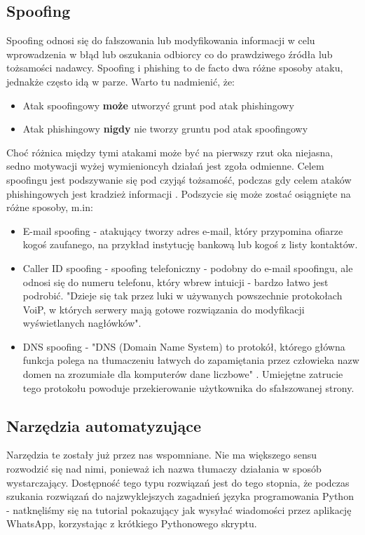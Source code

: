 \documentclass[]{article}
\begin{document}
\subsection{Spoofing}
Spoofing odnosi się do fałszowania lub modyfikowania informacji w celu wprowadzenia w błąd lub oszukania odbiorcy co do prawdziwego źródła lub tożsamości nadawcy. Spoofing i phishing to de facto dwa różne sposoby ataku, jednakże często idą w parze. Warto tu nadmienić, że:
\begin{itemize}[label=$\rightarrow$]
	\item Atak spoofingowy {\bfseries może} utworzyć grunt pod atak phishingowy
	\item Atak phishingowy {\bfseries nigdy} nie tworzy gruntu pod atak spoofingowy
\end{itemize}
Choć różnica między tymi atakami może być na pierwszy rzut oka niejasna, sedno motywacji wyżej wymienioncyh działań jest zgoła odmienne. Celem spoofingu jest podszywanie się pod czyjąś tożsamość, podczas gdy celem ataków phishingowych jest kradzież informacji \cite{crowdstrike_phishing_vs_spoofing}.
Podszycie się może zostać osiągnięte na różne sposoby, m.in:
\begin{itemize}[label=$\rightarrow$]
	\item E-mail spoofing - atakujący tworzy adres e-mail, który przypomina ofiarze kogoś zaufanego, na przykład instytucję bankową lub kogoś z listy kontaktów.
	\item Caller ID spoofing - spoofing telefoniczny - podobny do e-mail spoofingu, ale odnosi się do numeru telefonu, który wbrew intuicji - bardzo łatwo jest podrobić. "Dzieje się tak przez luki w używanych powszechnie protokołach VoiP, w których serwery mają gotowe rozwiązania do modyfikacji wyświetlanych nagłówków"\cite{netia_spoofing}.
	\item DNS spoofing - "DNS (Domain Name System) to protokół, którego główna funkcja polega na tłumaczeniu łatwych do zapamiętania przez człowieka nazw domen na zrozumiałe dla komputerów dane liczbowe" \cite{netia_dns}. Umiejętne zatrucie tego protokołu powoduje przekierowanie użytkownika do sfałszowanej strony.  
\end{itemize}

\subsection{Narzędzia automatyzujące}
Narzędzia te zostały już przez nas wspomniane. Nie ma większego sensu rozwodzić się nad nimi, ponieważ ich nazwa tłumaczy działania w sposób wystarczający. Dostępność tego typu rozwiązań jest do tego stopnia, że podczas szukania rozwiązań do najzwyklejszych zagadnień języka programowania Python - natknęliśmy się na tutorial pokazujący jak wysyłać wiadomości przez aplikację WhatsApp, korzystając z krótkiego Pythonowego skryptu. 
\end{document}
